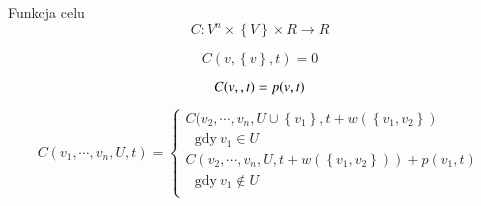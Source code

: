 \begin{block}{Funkcja celu}
	\begin{equation}
		C : V^n \times \left\{ V \right\} \times R \rightarrow R
	\end{equation}

	\begin{equation}
		C(v, \left\{ v \right\}, t) = 0
	\end{equation}

	\begin{equation}
		C(v, \empty, t) = p(v, t)
	\end{equation}

	\begin{equation}
		C(v_1, \cdots, v_n, U, t) = \begin{cases}
			C(v_2, \cdots, v_n, U \cup \left\{ v_1 \right\}, t + w(\left\{v_1, v_2\right\}) \\ 
			\	\	\	\text{gdy} \ v_1 \in U \\
			C(v_2, \cdots, v_n, U, t + w(\left\{v_1, v_2\right\})) + p(v_1, t) \\
			\	\	\	\text{gdy} \ v_1 \not\in U \\
		\end{cases}
	\end{equation}
\end{block}
